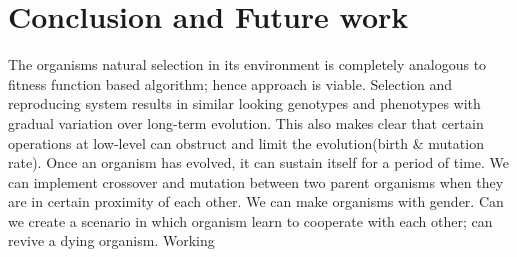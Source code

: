 \documentclass[conference]{IEEEtran}
\begin{document}
\section{Conclusion and Future work}
The organisms natural selection in its environment is completely analogous to fitness function based algorithm; hence approach is viable. Selection and reproducing system results in similar looking genotypes and phenotypes with gradual variation over long-term evolution. This also makes clear that certain operations at low-level can obstruct and limit the evolution(birth \& mutation rate). Once an organism has evolved, it can sustain itself for a period of time. We can implement crossover and mutation between two parent organisms when they are in certain proximity of each other. We can make organisms with gender. Can we create a scenario in which organism learn to cooperate with each other; can revive a dying organism.
Working
\end{document}
